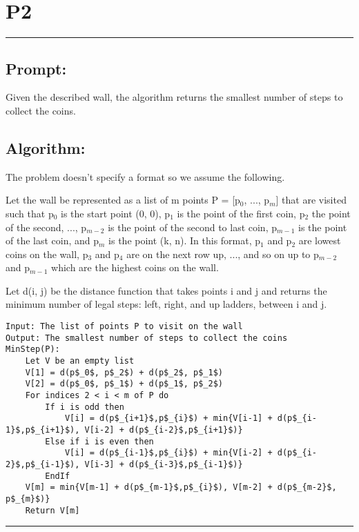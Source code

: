 \documentclass[11pt]{article}
\title{}
\author{}
\date{}
\begin{document}
\section*{P2}

\noindent\textcolor[RGB]{220,220,220}{\rule{\linewidth}{0.8pt}}

\subsection*{Prompt:} 

Given the described wall, the algorithm returns the smallest number of steps to collect the coins. 

\subsection*{Algorithm:} 

The problem doesn't specify a format so we assume the following.

Let the wall be represented as a list of m points P = [p$_0$, ..., p$_m$] that are visited such that p$_0$ is the start point (0, 0), p$_1$ is the point of the first coin, p$_2$ the point of the second, ..., p$_{m-2}$ is the point of the second to last coin, p$_{m-1}$ is the point of the last coin, and p$_m$ is the point (k, n). In this format, p$_1$ and p$_2$ are lowest coins on the wall, p$_3$ and p$_4$ are on the next row up, ..., and so on up to p$_{m-2}$ and p$_{m-1}$ which are the highest coins on the wall.

Let d(i, j) be the distance function that takes points i and j and returns the minimum number of legal steps: left, right, and up ladders, between i and j.

\begin{lstlisting}[basicstyle=\small, mathescape=true]
Input: The list of points P to visit on the wall
Output: The smallest number of steps to collect the coins
MinStep(P):
	Let V be an empty list
	V[1] = d(p$_0$, p$_2$) + d(p$_2$, p$_1$)
	V[2] = d(p$_0$, p$_1$) + d(p$_1$, p$_2$)
	For indices 2 < i < m of P do
		If i is odd then
			V[i] = d(p$_{i+1}$,p$_{i}$) + min{V[i-1] + d(p$_{i-1}$,p$_{i+1}$), V[i-2] + d(p$_{i-2}$,p$_{i+1}$)}
		Else if i is even then
			V[i] = d(p$_{i-1}$,p$_{i}$) + min{V[i-2] + d(p$_{i-2}$,p$_{i-1}$), V[i-3] + d(p$_{i-3}$,p$_{i-1}$)}
		EndIf
	V[m] = min{V[m-1] + d(p$_{m-1}$,p$_{i}$), V[m-2] + d(p$_{m-2}$, p$_{m}$)}
	Return V[m]
\end{lstlisting}

\noindent\textcolor[RGB]{220,220,220}{\rule{\linewidth}{0.8pt}}
\linebreak
\end{document}
